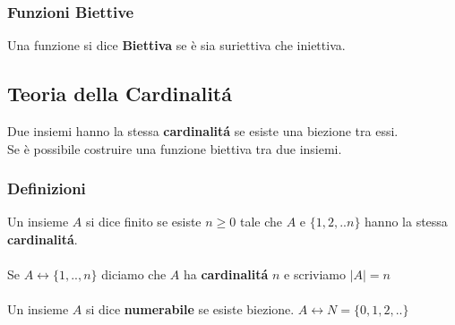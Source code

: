 \documentclass[11pt]{article}
\begin{document}
        \subsubsection{Funzioni Biettive}
            Una funzione si dice \textbf{Biettiva} se \`e sia suriettiva che iniettiva.
    \subsection{Teoria della Cardinalit\'a}
        Due insiemi hanno la stessa \textbf{cardinalit\'a} se esiste una biezione tra essi.\\
        Se \`e possibile costruire una funzione biettiva tra due insiemi.
        \subsubsection{Definizioni}
            Un insieme $A$ si dice finito se esiste $n \geq 0$ tale che $A$ e $\{1,2,..n\}$ hanno la stessa \textbf{cardinalit\'a}.  \\
            \\
            Se $A \longleftrightarrow \{1,..,n\}$ diciamo che $A$ ha \textbf{cardinalit\'a} $n$ e scriviamo  
            $|A|  =  n $ 
            \\
            \\
            Un insieme $A$ si dice \textbf{numerabile} se esiste biezione. 
            $A \longleftrightarrow N = \{0,1,2,..\}$
\end{document}
